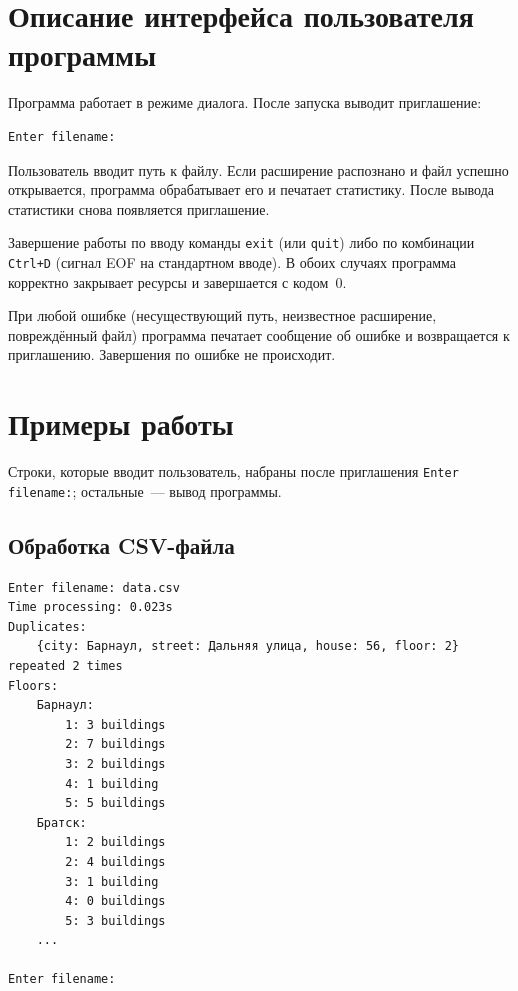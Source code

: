 \documentclass[12pt]{extarticle}
\renewcommand{\baselinestretch}{1.5}
\newcommand{\cmd}[1]{\texttt{#1}}
\begin{document}
\section{Описание интерфейса пользователя программы}

\lstset{style=session}

Программа работает в режиме диалога. После запуска выводит
приглашение:

\renewcommand{\baselinestretch}{1}
\begin{lstlisting}
Enter filename:
\end{lstlisting}
\renewcommand{\baselinestretch}{1.5}

Пользователь вводит путь к файлу. Если расширение распознано и
файл успешно открывается, программа обрабатывает его и печатает
статистику. После вывода статистики снова появляется приглашение.

Завершение работы по вводу команды \cmd{exit} (или \cmd{quit})
либо по комбинации \texttt{Ctrl+D} (сигнал EOF на стандартном
вводе). В обоих случаях программа корректно закрывает ресурсы и
завершается с кодом~0.

При любой ошибке (несуществующий путь, неизвестное расширение,
повреждённый файл) программа печатает сообщение об ошибке и
возвращается к приглашению. Завершения по ошибке не происходит.

\section{Примеры работы}

Строки, которые вводит пользователь, набраны после приглашения
\cmd{Enter filename:}; остальные~--- вывод программы.

\subsection{Обработка CSV-файла}

\renewcommand{\baselinestretch}{1}
\begin{lstlisting}
Enter filename: data.csv
Time processing: 0.023s
Duplicates:
    {city: Барнаул, street: Дальняя улица, house: 56, floor: 2} repeated 2 times
Floors:
    Барнаул:
        1: 3 buildings
        2: 7 buildings
        3: 2 buildings
        4: 1 building
        5: 5 buildings
    Братск:
        1: 2 buildings
        2: 4 buildings
        3: 1 building
        4: 0 buildings
        5: 3 buildings
    ...

Enter filename:
\end{lstlisting}
\renewcommand{\baselinestretch}{1.5}
\end{document}
